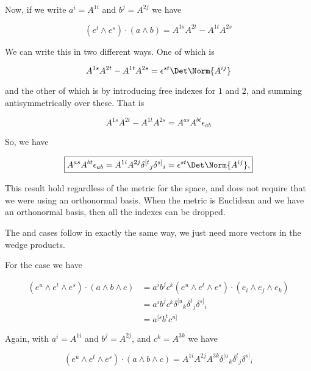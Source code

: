 Now, if we write $a^i = A^{1 i}$ and $b^j = A^{2 j}$ we have

\begin{equation}\label{eqn:relElectroDynProblemSet3:410}
(e^t \wedge e^s) \cdot (a \wedge b)
=
A^{1 s} A^{2 t} -A^{1 t} A^{2 s}
\end{equation}

We can write this in two different ways.  One of which is

\begin{equation}\label{eqn:relElectroDynProblemSet3:430}
A^{1 s} A^{2 t} -A^{1 t} A^{2 s} =
\epsilon^{s t} \Det \Norm{A^{ij}}
\end{equation}

and the other of which is by introducing free indexes for $1$ and $2$, and summing antisymmetrically over these.  That is

\begin{equation}\label{eqn:relElectroDynProblemSet3:450}
A^{1 s} A^{2 t} -A^{1 t} A^{2 s}
=
A^{a s} A^{b t} \epsilon_{a b}
\end{equation}

So, we have

\begin{equation}\label{eqn:relElectroDynProblemSet3:470}
\boxed{
A^{a s} A^{b t} \epsilon_{a b} =
A^{1 i} A^{2 j} {\delta^{[t}}_j {\delta^{s]}}_i =
\epsilon^{s t} \Det \Norm{A^{ij}},
}
\end{equation}

This result hold regardless of the metric for the space, and does not require that we were using an orthonormal basis.  When the metric is Euclidean and we have an orthonormal basis, then all the indexes can be dropped.

The  and  cases follow in exactly the same way, we just need more vectors in the wedge products.

For the  case we have

\begin{align*}
(e^u \wedge e^t \wedge e^s) \cdot ( a \wedge b \wedge c)
&=
a^i b^j c^k
(e^u \wedge e^t \wedge e^s) \cdot (e_i \wedge e_j \wedge e_k) \\
&=
a^i b^j c^k
{\delta^{[u}}_k
{\delta^{t}}_j
{\delta^{s]}}_i \\
&=
a^{[s} b^t c^{u]}
\end{align*}

Again, with $a^i = A^{1 i}$ and $b^j = A^{2 j}$, and $c^k = A^{3 k}$ we have

\begin{equation}\label{eqn:relElectroDynProblemSet3:490}
(e^u \wedge e^t \wedge e^s) \cdot ( a \wedge b \wedge c)
=
A^{1 i} A^{2 j} A^{3 k}
{\delta^{[u}}_k
{\delta^{t}}_j
{\delta^{s]}}_i
\end{equation}

